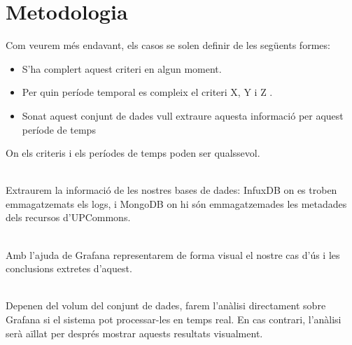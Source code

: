 \section{Metodologia}\label{sec:analysis-visualization-methodology}

\noindent
Com veurem més endavant, els casos se solen definir de les següents formes:

\begin{itemize}
    \item S’ha complert aquest criteri en algun moment.
    \item Per quin període temporal es compleix el criteri X, Y i Z .
    \item Sonat aquest conjunt de dades vull extraure aquesta informació per aquest període de temps
\end{itemize}

\noindent
On els criteris i els períodes de temps poden ser qualssevol.

\noindent \\
Extraurem la informació de les nostres bases de dades: InfuxDB on es troben emmagatzemats els logs, i MongoDB on hi són emmagatzemades les metadades dels recursos d’UPCommons.

\noindent \\
Amb l’ajuda de Grafana representarem de forma visual el nostre cas d’ús i les conclusions extretes d’aquest.

\noindent \\
Depenen del volum del conjunt de dades,  farem l’anàlisi directament sobre Grafana si el sistema pot processar-les en temps real.
En cas contrari, l’anàlisi serà aïllat per després mostrar aquests resultats visualment.
